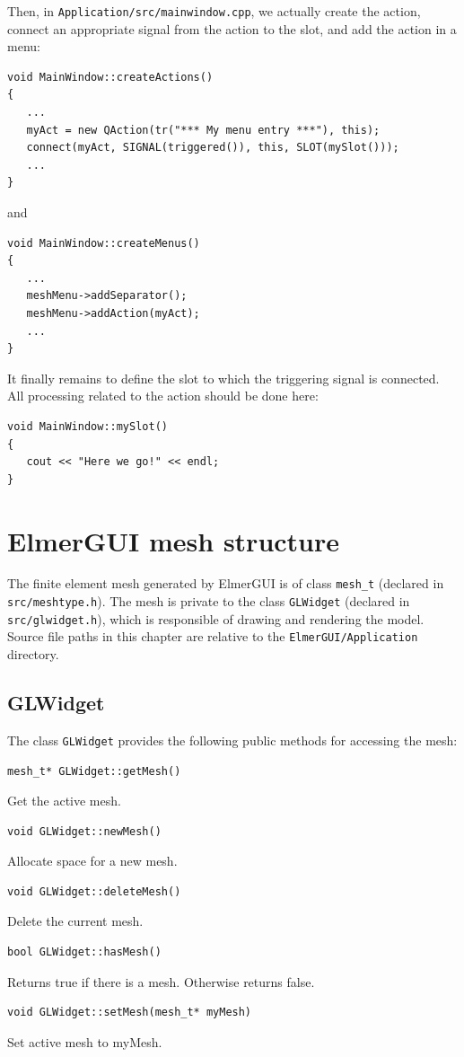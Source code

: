 Then, in {\tt Application/src/mainwindow.cpp}, we actually create the action, connect
an appropriate signal from the action to the slot, and add the action in
a menu:
\begin{verbatim}
void MainWindow::createActions()
{
   ...
   myAct = new QAction(tr("*** My menu entry ***"), this);
   connect(myAct, SIGNAL(triggered()), this, SLOT(mySlot()));
   ...
}
\end{verbatim}
and
\begin{verbatim}
void MainWindow::createMenus()
{
   ...
   meshMenu->addSeparator();
   meshMenu->addAction(myAct);
   ...
}
\end{verbatim}

It finally remains to define the slot to which the triggering signal is connected.
All processing related to the action should be done here:
\begin{verbatim}
void MainWindow::mySlot()
{
   cout << "Here we go!" << endl;
}
\end{verbatim}

\newpage

\chapter{ElmerGUI mesh structure}

The finite element mesh generated by ElmerGUI is of class {\tt mesh\_t}
(declared in {\tt src/meshtype.h}). The mesh is private to the class {\tt GLWidget}
(declared in {\tt src/glwidget.h}), which is responsible of drawing and
rendering the model. Source file paths in this chapter are relative to the
{\tt ElmerGUI/Application} directory.

\section{GLWidget}

The class {\tt GLWidget} provides the following public methods for accessing the mesh:
\begin{verbatim}
mesh_t* GLWidget::getMesh()
\end{verbatim}
Get the active mesh.
\begin{verbatim}
void GLWidget::newMesh()
\end{verbatim}
Allocate space for a new mesh.
\begin{verbatim}
void GLWidget::deleteMesh()
\end{verbatim}
Delete the current mesh.
\begin{verbatim}
bool GLWidget::hasMesh()
\end{verbatim}
Returns true if there is a mesh. Otherwise returns false.
\begin{verbatim}
void GLWidget::setMesh(mesh_t* myMesh)
\end{verbatim}
Set active mesh to myMesh.

